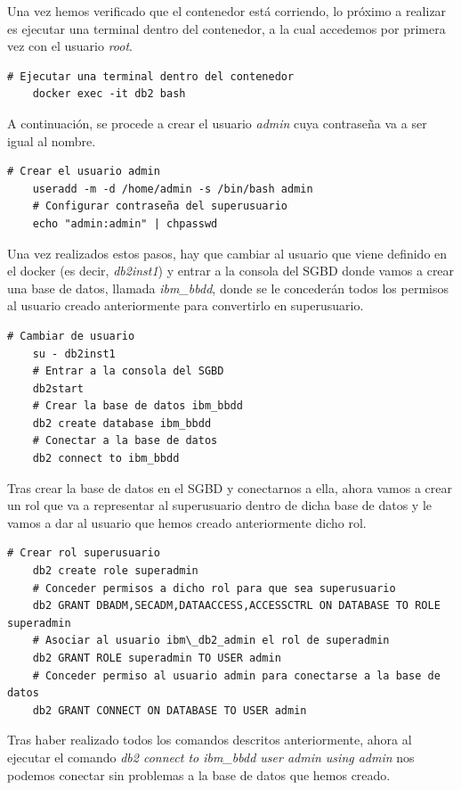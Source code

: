 \documentclass{article}
\begin{document}
Una vez hemos verificado que el contenedor está corriendo, lo próximo a realizar es ejecutar una terminal dentro del contenedor, a la cual accedemos por primera vez con el usuario \textit{root}.
\begin{lstlisting}[style=bashStyle]
    # Ejecutar una terminal dentro del contenedor
    docker exec -it db2 bash
\end{lstlisting}

A continuación, se procede a crear el usuario \textit{admin} cuya contraseña va a ser igual al nombre.
\begin{lstlisting}[style=bashStyle]
    # Crear el usuario admin
    useradd -m -d /home/admin -s /bin/bash admin
    # Configurar contraseña del superusuario
    echo "admin:admin" | chpasswd
\end{lstlisting}

Una vez realizados estos pasos, hay que cambiar al usuario que viene definido en el docker (es decir, \textit{db2inst1}) y entrar a la consola del SGBD donde vamos a crear una base de datos, llamada \textit{ibm\_bbdd}, donde se le concederán todos los permisos al usuario creado anteriormente para convertirlo en superusuario.
\begin{lstlisting}[style=bashStyle]
    # Cambiar de usuario
    su - db2inst1
    # Entrar a la consola del SGBD
    db2start
    # Crear la base de datos ibm_bbdd
    db2 create database ibm_bbdd
    # Conectar a la base de datos
    db2 connect to ibm_bbdd
\end{lstlisting}
Tras crear la base de datos en el SGBD y conectarnos a ella, ahora vamos a crear un rol que va a representar al superusuario dentro de dicha base de datos y le vamos a dar al usuario que hemos creado anteriormente dicho rol.
\begin{lstlisting}[style=bashStyle]
    # Crear rol superusuario
    db2 create role superadmin
    # Conceder permisos a dicho rol para que sea superusuario
    db2 GRANT DBADM,SECADM,DATAACCESS,ACCESSCTRL ON DATABASE TO ROLE superadmin
    # Asociar al usuario ibm\_db2_admin el rol de superadmin
    db2 GRANT ROLE superadmin TO USER admin
    # Conceder permiso al usuario admin para conectarse a la base de datos
    db2 GRANT CONNECT ON DATABASE TO USER admin
\end{lstlisting}
Tras haber realizado todos los comandos descritos anteriormente, ahora al ejecutar el comando \textit{db2 connect to ibm\_bbdd user admin using admin} nos podemos conectar sin problemas a la base de datos que hemos creado.
\end{document}
